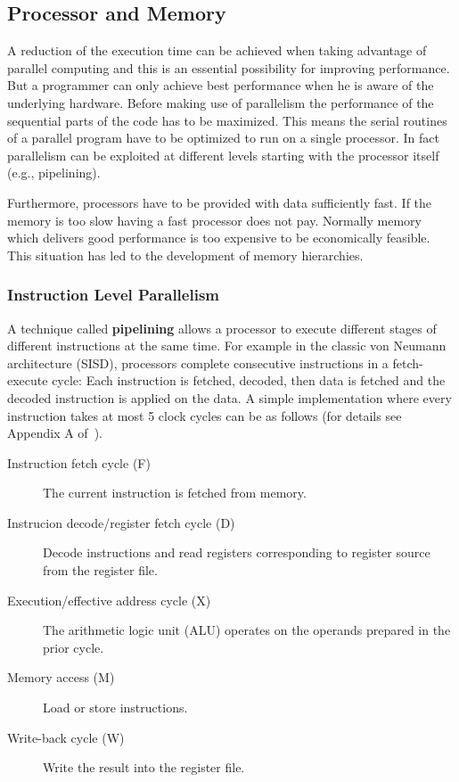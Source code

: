 \subsection{Processor and Memory}
\label{sec:processorandmemory}
A reduction of the execution time can be achieved when taking
advantage of parallel
computing and this is an essential possibility for improving
performance. But a programmer can only achieve best performance when
he is aware of the underlying hardware. Before making use of
parallelism the performance of the sequential parts of the code has to
be maximized. This means the serial routines of a parallel program
have to be optimized to run on a single processor. In fact parallelism can be
exploited at different levels starting with the processor
itself (e.g., pipelining).

Furthermore, processors have to be provided with data
sufficiently fast. If the memory is too slow having a fast processor
does not pay. Normally memory which delivers good performance is too
expensive to be economically feasible. This situation has led to the
development of memory hierarchies.

\subsubsection{Instruction Level Parallelism}
A technique called \textbf{pipelining} allows a processor to execute different
stages of different instructions at the same time.
For example in the classic von Neumann architecture (SISD), processors
complete consecutive instructions in a fetch-execute
cycle: Each instruction is fetched, decoded, then data is fetched and
the decoded instruction is applied on the data.
A simple implementation where every instruction takes at most 5 clock
cycles can be as follows (for details see Appendix A of~\cite{C1quant07}).
\begin{description}
\item[Instruction fetch cycle (F)] The current instruction is fetched from
  memory.
\item[Instrucion decode/register fetch cycle (D)] Decode instructions and
  read registers corresponding to register source from the register
  file.
\item[Execution/effective address cycle (X)] The arithmetic logic unit
  (ALU) operates on the operands prepared in the prior cycle.
\item[Memory access (M)] Load or store instructions.
\item[Write-back cycle (W)] Write the result into the register file.
\end{description}

